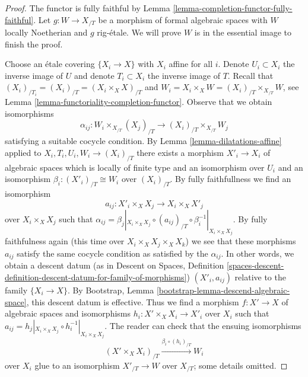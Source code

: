 \begin{proof}
The functor is fully faithful by
Lemma \ref{lemma-completion-functor-fully-faithful}.
Let $g : W \to X_{/T}$ be a morphism of formal algebraic spaces
with $W$ locally Noetherian and $g$ rig-\'etale.
We will prove $W$ is in the essential image to finish the proof.

\medskip\noindent
Choose an \'etale covering $\{X_i \to X\}$ with $X_i$ affine for all $i$.
Denote $U_i \subset X_i$ the inverse image of $U$ and denote
$T_i \subset X_i$ the inverse image of $T$.
Recall that $(X_i)_{/T_i} = (X_i)_{/T} = (X_i \times_X X)_{/T}$ and
$W_i = X_i \times_X W = (X_i)_{/T} \times_{X_{/T}} W$, see
Lemma \ref{lemma-functoriality-completion-functor}.
Observe that we obtain isomorphisms
$$
\alpha_{ij} :
W_i \times_{X_{/T}} (X_j)_{/T}
\longrightarrow 
(X_i)_{/T} \times_{X_{/T}} W_j
$$
satisfying a suitable cocycle condition.
By Lemma \ref{lemma-dilatations-affine} applied to
$X_i, T_i, U_i, W_i \to (X_i)_{/T}$
there exists a morphism $X'_i \to X_i$ of algebraic spaces
which is locally of finite type and an isomorphism over $U_i$
and an isomorphism $\beta_i : (X'_i)_{/T} \cong W_i$ over $(X_i)_{/T}$.
By fully faithfullness we find an isomorphism
$$
a_{ij} : X'_i \times_X X_j \longrightarrow X_i \times_X X'_j
$$
over $X_i \times_X X_j$ such that
$\alpha_{ij} = \beta_j|_{X_i \times_X X_j}
\circ (a_{ij})_{/T} \circ \beta_i^{-1}|_{X_i \times_X X_j}$.
By fully faithfulness again (this time over
$X_i \times_X X_j \times_X X_k$)
we see that these morphisms $a_{ij}$ satisfy the same
cocycle condition as satisfied by the $\alpha_{ij}$.
In other words, we obtain a descent datum
(as in Descent on Spaces, Definition
\ref{spaces-descent-definition-descent-datum-for-family-of-morphisms})
$(X'_i, a_{ij})$ relative to the family $\{X_i \to X\}$.
By Bootstrap, Lemma \ref{bootstrap-lemma-descend-algebraic-space},
this descent datum is effective. Thus we find a morphism
$f : X' \to X$ of algebraic spaces and isomorphisms
$h_i : X' \times_X X_i \to X'_i$ over $X_i$ such that
$a_{ij} = h_j|_{X_i \times_X X_j} \circ h_i^{-1}|_{X_i \times_X X_j}$.
The reader can check that the ensuing isomorphisms
$$
(X' \times_X X_i)_{/T}
\xrightarrow{\beta_i \circ (h_i)_{/T}}
W_i
$$
over $X_i$ glue to an isomorphism $X'_{/T} \to W$
over $X_{/T}$; some details omitted.
\end{proof}









